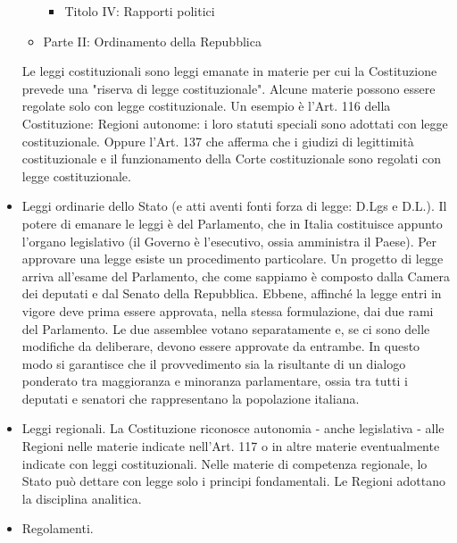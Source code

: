 \begin{itemize}
\begin{itemize}
\begin{itemize}
            \item Titolo IV: Rapporti politici
        \end{itemize}
        \item Parte II: Ordinamento della Repubblica
    \end{itemize}
    Le leggi costituzionali sono leggi emanate in materie per cui
    la Costituzione prevede una "riserva di legge costituzionale". Alcune materie possono essere regolate
    solo con legge costituzionale. \newline
    Un esempio è l'Art. 116 della Costituzione: Regioni autonome: i loro
    statuti speciali sono adottati con legge costituzionale. Oppure l'Art. 137 che afferma
    che i giudizi di legittimità costituzionale e il funzionamento della Corte costituzionale
    sono regolati con legge costituzionale.
    \item Leggi ordinarie dello Stato (e atti aventi fonti forza di legge: D.Lgs e D.L.). \newline
    Il potere di emanare le leggi è del Parlamento, che in Italia costituisce appunto l’organo 
    legislativo (il Governo è l’esecutivo, ossia amministra il Paese).\newline
    Per approvare una legge esiste un procedimento particolare. Un progetto di legge arriva 
    all’esame del Parlamento, che come sappiamo è composto dalla Camera dei deputati e dal Senato 
    della Repubblica. Ebbene, affinché la legge entri in vigore deve prima essere approvata, nella 
    stessa formulazione, dai due rami del Parlamento. Le due assemblee votano separatamente e, se 
    ci sono delle modifiche da deliberare, devono essere approvate da entrambe. In questo modo si 
    garantisce che il provvedimento sia la risultante di un dialogo ponderato tra maggioranza e 
    minoranza parlamentare, ossia tra tutti i deputati e senatori che rappresentano la popolazione italiana.
    \item Leggi regionali. \newline
    La Costituzione riconosce autonomia - anche legislativa - alle Regioni nelle materie indicate
    nell'Art. 117 o in altre materie eventualmente indicate con leggi costituzionali.\newline
    Nelle materie di competenza regionale, lo Stato può dettare con legge solo i principi
    fondamentali.\newline
    Le Regioni adottano la disciplina analitica.
    \item Regolamenti.\newline

\end{itemize}
